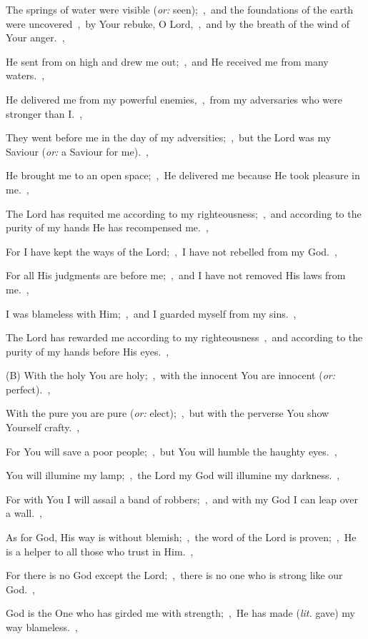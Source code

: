 \documentclass[12pt,twoside,a5paper]{article}
\newcommand{\translationoption}[1]{\emph{or:} #1}
\newcommand{\translationliteral}[1]{\emph{lit.} #1}
\begin{document}
\begin{normalparskip}
  The springs of water were visible (\translationoption{seen});~\sep\ and the foundations of the earth were uncovered~\sep\ by Your rebuke, O Lord,~\sep\ and by the breath of the wind of Your anger.~\sep

  He sent from on high and drew me out;~\sep\ and He received me from many waters.~\sep

  He delivered me from my powerful enemies,~\sep\ from my adversaries who were stronger than I.~\sep

  They went before me in the day of my adversities;~\sep\ but the Lord was my Saviour (\translationoption{a Saviour for me}).~\sep

  He brought me to an open space;~\sep\ He delivered me because He took pleasure in me.~\sep

  The Lord has requited me according to my righteousness;~\sep\ and according to the purity of my hands He has recompensed me.~\sep

  For I have kept the ways of the Lord;~\sep\ I	have not rebelled from my God.~\sep

  For all His judgments are before me;~\sep\ and I have not removed His laws from me.~\sep

  I was blameless with Him;~\sep\ and I guarded myself from my sins.~\sep

  The Lord has rewarded me according to my righteousness~\sep\ and according to the purity of my hands before His eyes.~\sep

  (B) With the holy You are holy;~\sep\ with the innocent You are innocent (\translationoption{perfect}).~\sep

  With the pure you are pure (\translationoption{elect});~\sep\ but with the perverse You show Yourself crafty.~\sep

  For You will save a poor people;~\sep\ but You will humble the haughty eyes.~\sep

  You will illumine my lamp;~\sep\ the Lord my God will illumine my darkness.~\sep

  For with You I will assail a band of robbers;~\sep\ and with my God I can leap over a wall.~\sep

  As for God, His way is without blemish;~\sep\ the word of the Lord is proven;~\sep\ He is a helper to all those who trust in Him.~\sep

  For there is no God except the Lord;~\sep\ there is no one who is strong like our God.~\sep

  God is the One who has girded me with strength;~\sep\ He has made (\translationliteral{gave}) my way blameless.~\sep


\end{normalparskip}
\end{document}
